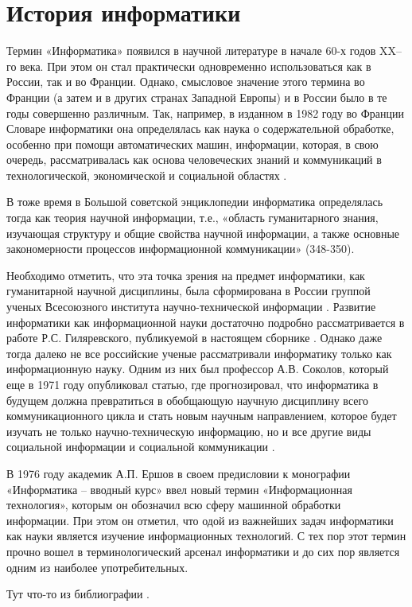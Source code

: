 \newpage

\section{История информатики} \label{sect1_2}

Термин «Информатика» появился в научной литературе в начале 60-х годов XX–го века. При этом он стал практически одновременно использоваться как в России, так и во Франции. Однако, смысловое значение этого термина во Франции (а затем и в других странах Западной Европы) и в России было в те годы совершенно различным. Так, например, в изданном в 1982 году во Франции Словаре информатики она определялась как наука о содержательной обработке, особенно при помощи автоматических машин, информации, которая, в свою очередь, рассматривалась как основа человеческих знаний и коммуникаций в технологической, экономической и социальной областях \cite{bib202}.

В тоже время в Большой советской энциклопедии информатика определялась тогда как теория научной информации, т.е., «область гуманитарного знания, изучающая структуру и общие свойства научной информации, а также основные закономерности процессов информационной коммуникации» \cite{bib203}(348-350). 



Необходимо отметить, что эта точка зрения на предмет информатики, как гуманитарной научной дисциплины, была сформирована в России группой ученых Всесоюзного института научно-технической информации \cite{bib204,bib205}. Развитие информатики как информационной науки достаточно подробно рассматривается в работе Р.С. Гиляревского, публикуемой в настоящем сборнике \cite{bib206}.  Однако даже тогда далеко не все российские ученые рассматривали информатику только как информационную науку. Одним из них был профессор А.В. Соколов, который еще в 1971 году опубликовал статью, где прогнозировал, что информатика в будущем должна превратиться в обобщающую научную дисциплину всего коммуникационного цикла  и стать новым научным направлением, которое будет изучать не только научно-техническую информацию, но и все другие виды социальной информации и социальной коммуникации \cite{bib207}.

       В 1976 году академик А.П. Ершов в своем предисловии к монографии «Информатика – вводный курс» ввел новый термин «Информационная технология», которым он обозначил всю сферу машинной обработки информации. При этом он отметил, что одой из важнейших задач информатики как науки является изучение информационных технологий. С тех пор этот термин прочно вошел в терминологический арсенал информатики и до сих пор является одним из наиболее употребительных.


Тут что-то из библиографии \cite{bib102}. 




\clearpage
